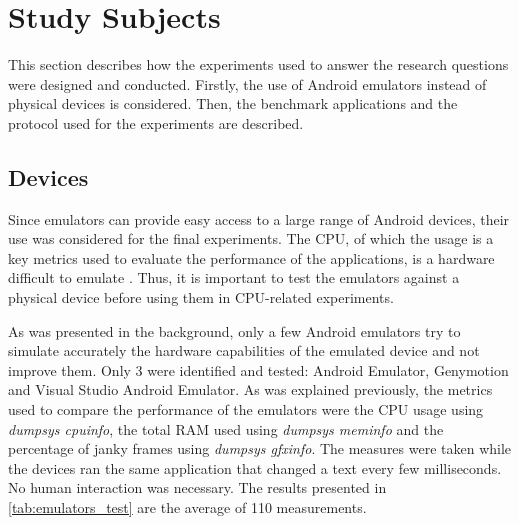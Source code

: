 \section{Study Subjects}

This section describes how the experiments used to answer the research questions were designed and conducted. Firstly, the use of Android emulators instead of physical devices is considered. Then, the benchmark applications and the protocol used for the experiments are described.

\subsection{Devices}
\label{method:emulators}

Since emulators can provide easy access to a large range of Android devices, their use was considered for the final experiments. The CPU, of which the usage is a key metrics used to evaluate the performance of the applications, is a hardware difficult to emulate \cite{cpu_emulator}. Thus, it is important to test the emulators against a physical device before using them in CPU-related experiments.

As was presented in the background, only a few Android emulators try to simulate accurately the hardware capabilities of the emulated device  and not improve them. Only 3 were identified and tested: Android Emulator, Genymotion and Visual Studio Android Emulator. As was explained previously, the metrics used to compare the performance of the emulators were the CPU usage using \textit{dumpsys cpuinfo}, the total RAM used using \textit{dumpsys meminfo} and the percentage of janky frames using \textit{dumpsys gfxinfo}. The measures were taken while the devices ran the same application that changed a text every few milliseconds. No human interaction was necessary. The results presented in \autoref{tab:emulators_test} are the average of 110 measurements.

\begin{table}[!ht]
    \caption{Emulators Tests}
    \label{tab:emulators_test}
\end{table}

